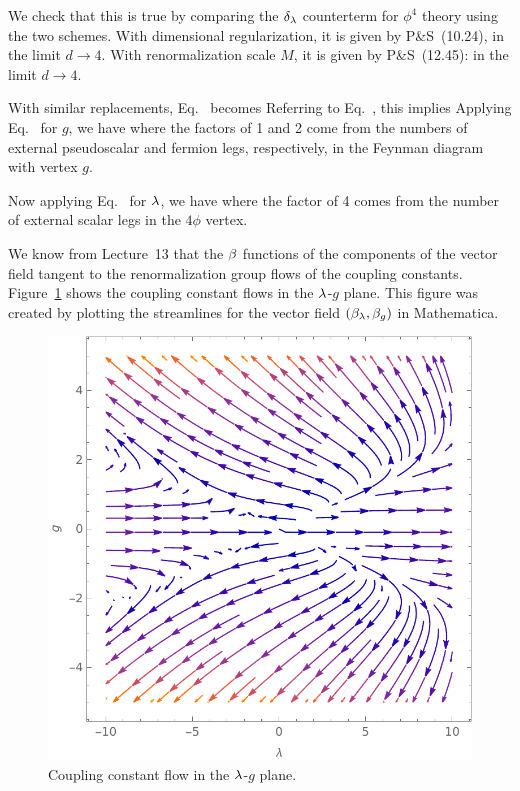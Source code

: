 {	We check that this is true by comparing the $\delta_\lambda$ counterterm for $\phi^4$ theory using the two schemes.  With dimensional regularization, it is given by P\&S~(10.24),
	in the limit $d \to 4$.  With renormalization scale $M$, it is given by P\&S~(12.45):
	in the limit $d \to 4$.
	
	With similar replacements, Eq.~ becomes
	Referring to Eq.~, this implies
	Applying Eq.~ for $g$, we have
	where the factors of 1 and 2 come from the numbers of external pseudoscalar and fermion legs, respectively, in the Feynman diagram with vertex $g$.
	
	Now applying Eq.~ for $\lambda$, we have
	where the factor of 4 comes from the number of external scalar legs in the $4\phi$ vertex.
	
	We know from Lecture~13 that the $\beta$ functions of the components of the vector field tangent to the renormalization group flows of the coupling constants.  Figure~\ref{f1} shows the coupling constant flows in the $\lambda$-$g$ plane.  This figure was created by plotting the streamlines for the vector field $(\beta_\lambda, \beta_g)$ in Mathematica.
	
	\begin{figure} \centering
		\includegraphics[width=.4\textwidth]{1}
		\caption{Coupling constant flow in the $\lambda$-$g$ plane.}
		\label{f1}
	\end{figure}
}